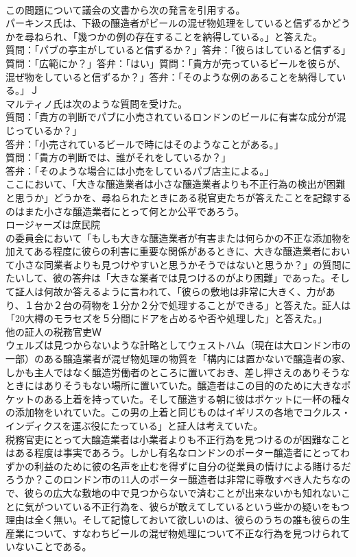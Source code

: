 \documentclass[8pt]{extreport}
\begin{document}
\begin{CJK}{UTF8}{min}
\\	この問題について議会の文書から次の発言を引用する。
\\	パーキンス氏は、下級の醸造者がビールの混ぜ物処理をしていると信ずるかどうかを尋ねられ、「幾つかの例の存在することを納得している。」と答えた。
\\	質問：「パブの亭主がしていると信ずるか？」答弁：「彼らはしていると信ずる」質問：「広範にか？」答弁：「はい」質問：「貴方が売っているビールを彼らが、混ぜ物をしていると信ずるか？」答弁：「そのような例のあることを納得している。」Ｊ
\\	マルティノ氏は次のような質問を受けた。
\\	質問：「貴方の判断でパブに小売されているロンドンのビールに有害な成分が混じっているか？」
\\	答弁：「小売されているビールで時にはそのようなことがある。」
\\	質問：「貴方の判断では、誰がそれをしているか？」
\\	答弁：「そのような場合には小売をしているパブ店主による。」
\\	ここにおいて、「大きな醸造業者は小さな醸造業者よりも不正行為の検出が困難と思うか」どうかを、尋ねられたときにある税官吏たちが答えたことを記録するのはまた小さな醸造業者にとって何とか公平であろう。
\\	ロージャーズは庶民院
\\	の委員会において「もしも大きな醸造業者が有害または何らかの不正な添加物を加えてある程度に彼らの利害に重要な関係があるときに、大きな醸造業者において小さな同業者よりも見つけやすいと思うかそうではないと思うか？」の質問にたいして、彼の答弁は「大きな業者では見つけるのがより困難」であった。そして証人は何故か答えるように言われて、「彼らの敷地は非常に大きく、力があり、１台か２台の荷物を１分か２分で処理することができる」と答えた。証人は「20大樽のモラセズを５分間にドアを占めるや否や処理した」と答えた。」
\\	他の証人の税務官吏Ｗ
\\	ウェルズは見つからないような計略としてウェストハム（現在は大ロンドン市の一部）のある醸造業者が混ぜ物処理の物質を「構内には置かないで醸造者の家、しかも主人ではなく醸造労働者のところに置いておき、差し押さえのありそうなときにはありそうもない場所に置いていた。醸造者はこの目的のために大きなポケットのある上着を持っていた。そして醸造する朝に彼はポケットに一杯の種々の添加物をいれていた。この男の上着と同じものはイギリスの各地でコクルス・インディクスを運ぶ役にたっている」と証人は考えていた。
\\	税務官吏にとって大醸造業者は小業者よりも不正行為を見つけるのが困難なことはある程度は事実であろう。しかし有名なロンドンのポーター醸造者にとってわずかの利益のために彼の名声を止むを得ずに自分の従業員の情けによる賭けるだろうか？このロンドン市の11人のポーター醸造者は非常に尊敬すべき人たちなので、彼らの広大な敷地の中で見つからないで済むことが出来ないかも知れないことに気がついている不正行為を、彼らが敢えてしているという些かの疑いをもつ理由は全く無い。そして記憶しておいて欲しいのは、彼らのうちの誰も彼らの生産業について、すなわちビールの混ぜ物処理について不正な行為を見つけられていないことである。

\end{CJK}
\end{document}
